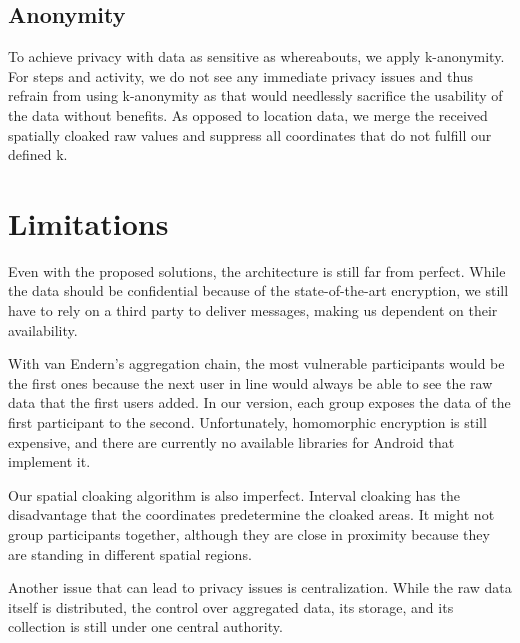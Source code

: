 \subsection{Anonymity}
To achieve privacy with data as sensitive as whereabouts, we apply k-anonymity. For steps and activity, we do not see any immediate privacy issues and thus refrain from using k-anonymity as that would needlessly sacrifice the usability of the data without benefits. As opposed to location data, we merge the received spatially cloaked raw values and suppress all coordinates that do not fulfill our defined k. 

\section{Limitations}
Even with the proposed solutions, the architecture is still far from perfect. While the data should be confidential because of the state-of-the-art encryption, we still have to rely on a third party to deliver messages, making us dependent on their availability.

With van Endern's aggregation chain, the most vulnerable participants would be the first ones because the next user in line would always be able to see the raw data that the first users added. In our version, each group exposes the data of the first participant to the second. Unfortunately, homomorphic encryption is still expensive, and there are currently no available libraries for Android that implement it.

Our spatial cloaking algorithm is also imperfect. Interval cloaking has the disadvantage that the coordinates predetermine the cloaked areas. It might not group participants together, although they are close in proximity  because they are standing in different spatial regions.

Another issue that can lead to privacy issues is centralization. While the raw data itself is distributed, the control over aggregated data, its storage, and its collection is still under one central authority.